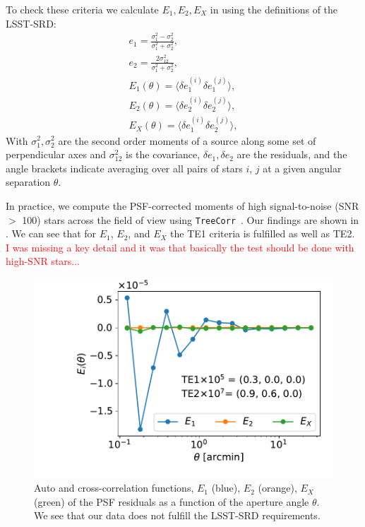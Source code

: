\documentclass[twocolumn]{aastex62}
\begin{document}
To check these criteria we calculate $E_{1}, E_{2}, E_{X}$ in using the definitions of the LSST-SRD:
\begin{eqnarray}
e_{1} = \frac{\sigma^{2}_{1} - \sigma^{2}_{2}}{\sigma_{1}^{2}+\sigma_{2}^{2}},\\
e_{2} = \frac{2\sigma^{2}_{12}}{\sigma_{1}^{2}+\sigma_{2}^{2}},\\
E_{1} (\theta) = \langle \delta e^{(i)}_{1}\delta e^{(j)}_{1} \rangle,\\
E_{2} (\theta) = \langle \delta e^{(i)}_{2}\delta e^{(j)}_{2} \rangle,\\
E_{X} (\theta) = \langle \delta e^{(i)}_{1}\delta e^{(j)}_{2} \rangle,
\end{eqnarray}
With $\sigma_{1}^{2}, \sigma_{2}^{2}$ are the second order moments of a source along some set of perpendicular axes and $\sigma^{2}_{12}$ is the covariance, $\delta e_{1}, \delta e_{2}$ are the residuals, and the angle brackets indicate averaging over all pairs of stars $i$, $j$ at a given angular separation $\theta$.

In practice, we compute the PSF-corrected moments of high signal-to-noise (SNR $>$ 100) stars across the field of view using \texttt{TreeCorr}~\citep{2004MNRAS.352..338J}. Our findings are shown in . We can see that for $E_{1}$, $E_{2}$, and $E_{X}$ the TE1 criteria is fulfilled as well as TE2. 
\textcolor{red}{I was missing a key detail and it was that basically the test should be done with high-SNR stars...}
\begin{figure}
\centering
\includegraphics[width=0.9\columnwidth]{TEx}
\caption{Auto and cross-correlation functions, $E_{1}$ (blue), $E_{2}$ (orange), $E_{X}$ (green) of the PSF residuals as a function of the aperture angle $\theta$. We see that our data does not fulfill the LSST-SRD requirements.}
\label{fig:TEx}
\end{figure}
\end{document}
